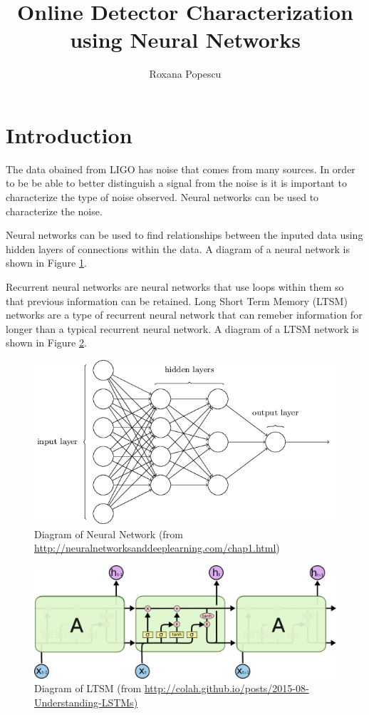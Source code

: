 \documentclass[colorlinks=true,pdfstartview=FitV,linkcolor=blue,
            citecolor=red,urlcolor=magenta]{ligodoc}
\title{Online Detector Characterization using Neural Networks}
\author{Roxana Popescu}
\begin{document}
\section{Introduction} 
\par The data obained from LIGO has noise that comes from many sources. In order to be be able to better distinguish a signal from the noise is it is important to characterize the type of noise observed. Neural networks can be used to characterize the noise.

\par Neural networks can be used to find relationships between the inputed data using hidden layers of connections within the data. A diagram of a neural network is shown in Figure \ref{fig:image1}.

\par  Recurrent neural networks are neural networks that use  loops within them so that previous information can be retained. Long Short Term Memory (LTSM) networks are a type of recurrent neural network that can remeber information for longer than a typical recurrent neural network. A diagram of a LTSM network is shown in Figure \ref{fig:image2}. 

\begin{figure}[htbp]
\begin{center}
\includegraphics[width=5in]{neuralnetwork.png}
\caption{Diagram of Neural Network (from \url{http://neuralnetworksanddeeplearning.com/chap1.html})}
\label{fig:image1}
\end{center}
\end{figure}    

\begin{figure}[htbp]
\begin{center}
\includegraphics[width=5in]{ltsm.png}
\caption{Diagram of LTSM (from \url{http://colah.github.io/posts/2015-08-Understanding-LSTMs)}}
\label{fig:image2}
\end{center}
\end{figure}   
\end{document}
